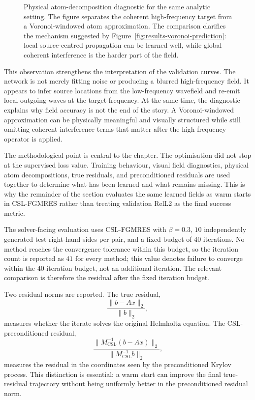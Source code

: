 \begin{figure}[htbp]
    \centering
    \caption{Physical atom-decomposition diagnostic for the same analytic
    setting. The figure separates the coherent high-frequency target from a
    Voronoi-windowed atom approximation. The comparison clarifies the
    mechanism suggested by Figure~\ref{fig:results-voronoi-prediction}: local
    source-centred propagation can be learned well, while global coherent
    interference is the harder part of the field.}
    \label{fig:results-voronoi-atoms}
\end{figure}

This observation strengthens the interpretation of the validation curves. The
network is not merely fitting noise or producing a blurred high-frequency
field. It appears to infer source locations from the low-frequency wavefield
and re-emit local outgoing waves at the target frequency. At the same time,
the diagnostic explains why field accuracy is not the end of the story. A
Voronoi-windowed approximation can be physically meaningful and visually
structured while still omitting coherent interference terms that matter after
the high-frequency operator is applied.

The methodological point is central to the chapter. The optimisation did not
stop at the supervised loss value. Training behaviour, visual field
diagnostics, physical atom decompositions, true residuals, and preconditioned
residuals are used together to determine what has been learned and what
remains missing. This is why the remainder of the section evaluates the same
learned fields as warm starts in CSL-FGMRES rather than treating validation
RelL2 as the final success metric.

The solver-facing evaluation uses CSL-FGMRES with $\beta=0.3$, $10$
independently generated test right-hand sides per pair, and a fixed budget of
$40$ iterations. No method reaches the convergence tolerance within this
budget, so the iteration count is reported as $41$ for every method; this
value denotes failure to converge within the $40$-iteration budget, not an
additional iteration. The relevant comparison is therefore the residual after
the fixed iteration budget.

Two residual norms are reported. The true residual,
\[
    \frac{\|b-Ax\|_2}{\|b\|_2},
\]
measures whether the iterate solves the original Helmholtz equation. The
CSL-preconditioned residual,
\[
    \frac{\|M_{\mathrm{CSL}}^{-1}(b-Ax)\|_2}
         {\|M_{\mathrm{CSL}}^{-1}b\|_2},
\]
measures the residual in the coordinates seen by the preconditioned Krylov
process. This distinction is essential: a warm start can improve the final
true-residual trajectory without being uniformly better in the
preconditioned residual norm.

